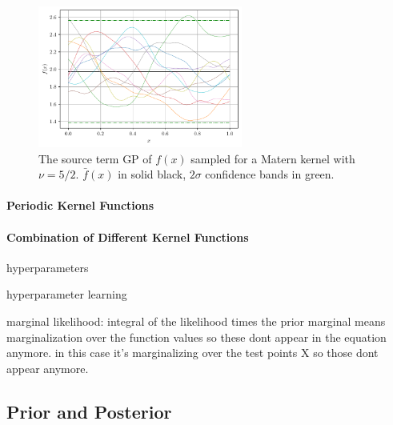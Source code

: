 \documentclass[%
  a4paper,oneside,%
  11pt,%
  smallchapters,
  green,%
  rgb, <cmyk>
  ]{tubsbook}
\begin{document}
\begin{figure}[h]
\begin{center}

\includegraphics[width=0.6\textwidth]{pics/matern5_2_f_sampled}
\caption{The source term GP of $f(x)$ sampled for a Matern kernel with $\nu=5/2$. $\bar{f}(x)$ in solid black, $2\sigma$ confidence bands in green.}
\label{fig:Matern5_2}

\end{center}
\end{figure}


\paragraph{Periodic Kernel Functions}

\paragraph{Combination of Different Kernel Functions}


hyperparameters

hyperparameter learning

marginal likelihood: integral of the likelihood times the prior
marginal means marginalization over the function values so these dont appear in the equation anymore. in this case it's marginalizing over the test points X so those dont appear anymore.


\subsection{Prior and Posterior}
\end{document}
